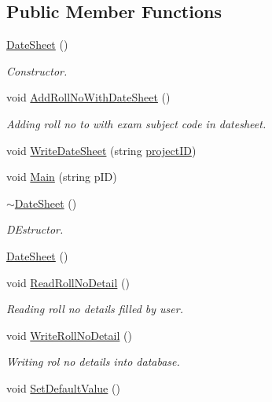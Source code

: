 \subsection*{\-Public \-Member \-Functions}
\begin{DoxyCompactItemize}
\item 
\hyperlink{classDateSheet_a17a1e5adc9b48e53091b89061ee0a360}{\-Date\-Sheet} ()
\begin{DoxyCompactList}\small\item\em \-Constructor. \end{DoxyCompactList}\item 
void \hyperlink{classDateSheet_a8c1bd0daf35e3ea6f962a03fe78cdfa3}{\-Add\-Roll\-No\-With\-Date\-Sheet} ()
\begin{DoxyCompactList}\small\item\em \-Adding roll no to with exam subject code in datesheet. \end{DoxyCompactList}\item 
void \hyperlink{classDateSheet_a3f7ea57a0ed85dc6c09f0eda9c30016b}{\-Write\-Date\-Sheet} (string \hyperlink{classInputDetail_a08069ee622c626c038b821ddcc7427b4}{project\-I\-D})
\item 
void \hyperlink{classDateSheet_af749306c14297b5c93c16f48f551d5bb}{\-Main} (string p\-I\-D)
\item 
\hyperlink{classDateSheet_af17d25ae4f39caf7b9ea62d73541813b}{$\sim$\-Date\-Sheet} ()
\begin{DoxyCompactList}\small\item\em \-D\-Estructor. \end{DoxyCompactList}\item 
\hyperlink{classDateSheet_a17a1e5adc9b48e53091b89061ee0a360}{\-Date\-Sheet} ()
\item 
void \hyperlink{classDateSheet_a0d68cd26658c7dfc37ef512e6ed30528}{\-Read\-Roll\-No\-Detail} ()
\begin{DoxyCompactList}\small\item\em \-Reading roll no details filled by user. \end{DoxyCompactList}\item 
void \hyperlink{classDateSheet_ab34e451b5322710f149a1fff5386d852}{\-Write\-Roll\-No\-Detail} ()
\begin{DoxyCompactList}\small\item\em \-Writing rol no details into database. \end{DoxyCompactList}\item 
void \hyperlink{classDateSheet_a2eab7d9256cd56064671ac4974846a7a}{\-Set\-Default\-Value} ()

\end{DoxyCompactItemize}
